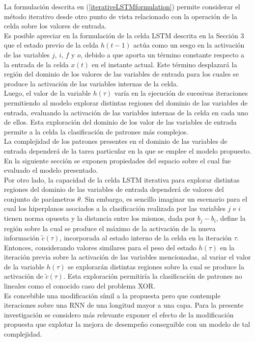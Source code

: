\documentclass{article}
\begin{document}
	La formulación descrita en (\ref{iterativeLSTMformulation}) permite considerar el método iterativo desde otro punto de vista relacionado con la operación de la celda sobre los valores de entrada.\\
	Es posible apreciar en la formulación de la celda LSTM descrita en la Sección 3 que el estado previo de la celda $h(t-1)$ actúa como un sesgo en la activación de las variables $j$, $i$, $f$ y $o$, debido a que aporta un término constante respecto a la entrada de la celda $x(t)$ en el instante actual. Este término desplazará la región del dominio de los valores de las variables de entrada para los cuales se produce la activación de las variables internas de la celda.\\
	Luego, el valor de la variable $h(\tau)$ varía en la ejecución de sucesivas iteraciones permitiendo al modelo explorar distintas regiones del dominio de las variables de entrada, evaluando la activación de las variables internas de la celda en cada uno de ellos. Esta exploración del dominio de los valor de las variables de entrada permite a la celda la clasificación de patrones más complejos.\\
	La complejidad de los patrones presentes en el dominio de las variables de entrada dependerá de la tarea particular en la que se emplee el modelo propuesto. En la siguiente sección se exponen propiedades del espacio sobre el cual fue evaluado el modelo presentado.\\
	Por otro lado, la capacidad de la celda LSTM iterativa para explorar distintas regiones del dominio de las variables de entrada dependerá de valores del conjunto de parámetros $\theta$. Sin embargo, es sencillo imaginar un escenario para el cual los hiperplanos asociados a la clasificación realizada por las variables $j$ e $i$ tienen norma opuesta y la distancia entre los mismos, dada por $b_j - b_i$, define la región sobre la cual se produce el máximo de la activación de la nueva información $\tilde{c}(\tau)$, incorporada al estado interno de la celda en la iteración $\tau$. Entonces, considerando valores similares para el peso del estado $h(\tau)$ en la iteración previa sobre la activación de las variables mencionadas, al variar el valor de la variable $h(\tau)$ se explorarán distintas regiones sobre la cual se produce la activación de $\tilde{c}(\tau)$. Esta exploración permitiría la clasificación de patrones no lineales como el conocido caso del problema XOR\cite{33TimeXORElman}.\\
	
	Es concebible una modificación símil a la propuesta pero que contemple iteraciones sobre una RNN de una longitud mayor a una capa. Para la presente investigación se considero más relevante exponer el efecto de la modificación propuesta que explotar la mejora de desempeño conseguible con un modelo de tal complejidad.\\
	
\end{document}

